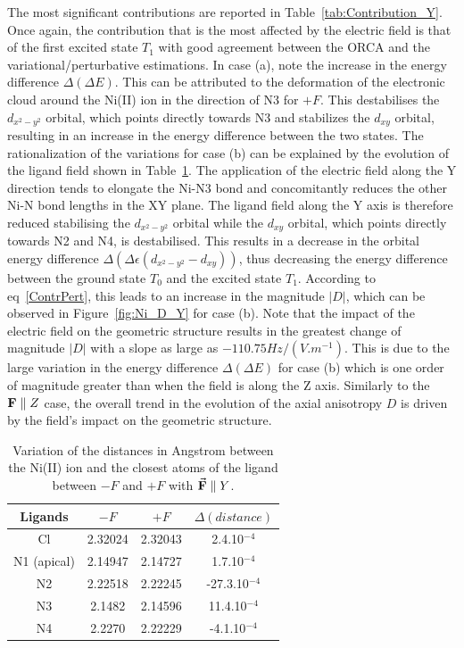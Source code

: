 \documentclass[12pt,a4paper]{report}
\numberwithin{equation}{section}
\begin{document}
The most significant contributions are reported in Table~\ref{tab:Contribution_Y}. 
Once again, the contribution that is the most affected by the electric field is that of the first excited state $T_1$ with good agreement between the ORCA and the variational/perturbative estimations.
In case (a), note the increase in the energy difference $\Delta (\Delta E)$.
This can be attributed to the deformation of the electronic cloud around the Ni(II) ion in the direction of N3 for $+F$. 
This destabilises the $d_{x^2-y^2}$ orbital, which points directly towards N3 and stabilizes the $d_{xy}$ orbital, resulting in an increase in the energy difference between the two states.
The rationalization of the variations for case (b) can be explained by the evolution of the ligand field shown in Table~\ref{tab:DistanceY}.
The application of the electric field along the Y direction tends to elongate the Ni-N3 bond and concomitantly reduces the other Ni-N bond lengths in the XY plane.
The ligand field along the Y axis is therefore reduced stabilising the $d_{x^2-y^2}$ orbital while the $d_{xy}$ orbital, which points directly towards N2 and N4, is destabilised. 
This results in a decrease in the orbital energy difference $\Delta (\Delta \epsilon (d_{x^2-y^2}-d_{xy}))$, thus decreasing the energy difference between the ground state $T_0$ and the excited state $T_1$.
According to eq~\ref{ContrPert}, this leads to an increase in the magnitude $|D|$, which can be observed in Figure~\ref{fig:Ni_D_Y} for case (b).
Note that the impact of the electric field on the geometric structure results in the greatest change of magnitude $|D|$ with a slope as large as $-110.75 Hz/(V.m^{-1})$.
This is due to the large variation in the energy difference $\Delta (\Delta E)$ for case (b) which is one order of magnitude greater than when the field is along the Z axis.
Similarly to the $\vb{F}\parallel Z$ case, the overall trend in the evolution of the axial anisotropy $D$ is driven by the field's impact on the geometric structure.


\begin{table}[!ht]
    \centering
    \begin{tabular}{| c | c| c | c |}
        \hline
        Ligands & $-F$ & $+F$ &$\Delta(distance)$\\
        \hline
        Cl & 2.32024& 2.32043&  2.4.10$^{-4}$\\
        N1 (apical) & 2.14947  & 2.14727 &1.7.10$^{-4}$\\
        N2 & 2.22518& 2.22245&-27.3.10$^{-4}$ \\
        N3 & 2.1482& 2.14596&11.4.10$^{-4}$ \\
        N4 & 2.2270& 2.22229 &-4.1.10$^{-4}$\\
        \hline
    \end{tabular}
    \caption{Variation of the distances in Angstrom between the Ni(II) ion and the closest atoms of the ligand between $-F$ and $+F$ with $\vec{\vb{F}}\parallel Y$.}
    \label{tab:DistanceY}
\end{table}
\end{document}

